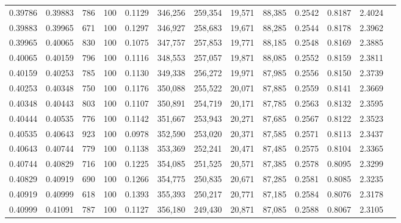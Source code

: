 \begin{tabular}{rrrrrrrrrrrrr}
0.39786 & 0.39883 &   786 & 100 &                                     0.1129 & 346,256 & 259,354 &  19,571 &  88,385 & 0.2542 & 0.8187 & 2.4024 \\
0.39883 & 0.39965 &   671 & 100 &                                     0.1297 & 346,927 & 258,683 &  19,671 &  88,285 & 0.2544 & 0.8178 & 2.3962 \\
0.39965 & 0.40065 &   830 & 100 &                                     0.1075 & 347,757 & 257,853 &  19,771 &  88,185 & 0.2548 & 0.8169 & 2.3885 \\
0.40065 & 0.40159 &   796 & 100 &                                     0.1116 & 348,553 & 257,057 &  19,871 &  88,085 & 0.2552 & 0.8159 & 2.3811 \\
0.40159 & 0.40253 &   785 & 100 &                                     0.1130 & 349,338 & 256,272 &  19,971 &  87,985 & 0.2556 & 0.8150 & 2.3739 \\
0.40253 & 0.40348 &   750 & 100 &                                     0.1176 & 350,088 & 255,522 &  20,071 &  87,885 & 0.2559 & 0.8141 & 2.3669 \\
0.40348 & 0.40443 &   803 & 100 &                                     0.1107 & 350,891 & 254,719 &  20,171 &  87,785 & 0.2563 & 0.8132 & 2.3595 \\
0.40444 & 0.40535 &   776 & 100 &                                     0.1142 & 351,667 & 253,943 &  20,271 &  87,685 & 0.2567 & 0.8122 & 2.3523 \\
0.40535 & 0.40643 &   923 & 100 &                                     0.0978 & 352,590 & 253,020 &  20,371 &  87,585 & 0.2571 & 0.8113 & 2.3437 \\
0.40643 & 0.40744 &   779 & 100 &                                     0.1138 & 353,369 & 252,241 &  20,471 &  87,485 & 0.2575 & 0.8104 & 2.3365 \\
0.40744 & 0.40829 &   716 & 100 &                                     0.1225 & 354,085 & 251,525 &  20,571 &  87,385 & 0.2578 & 0.8095 & 2.3299 \\
0.40829 & 0.40919 &   690 & 100 &                                     0.1266 & 354,775 & 250,835 &  20,671 &  87,285 & 0.2581 & 0.8085 & 2.3235 \\
0.40919 & 0.40999 &   618 & 100 &                                     0.1393 & 355,393 & 250,217 &  20,771 &  87,185 & 0.2584 & 0.8076 & 2.3178 \\
0.40999 & 0.41091 &   787 & 100 &                                     0.1127 & 356,180 & 249,430 &  20,871 &  87,085 & 0.2588 & 0.8067 & 2.3105 \\

\end{tabular}
